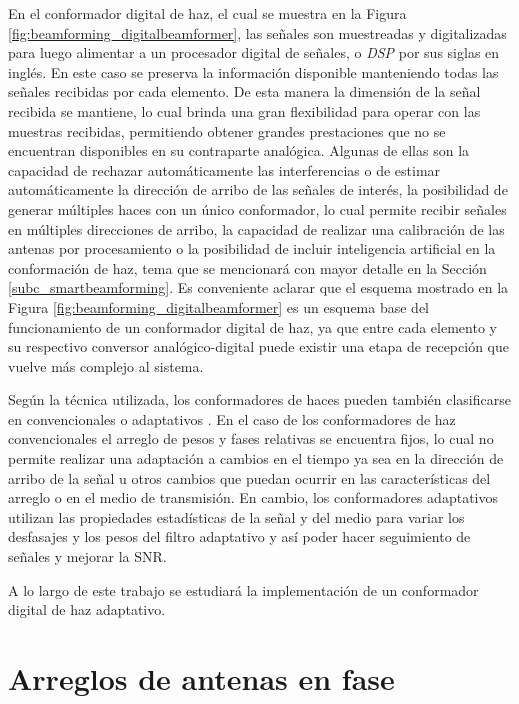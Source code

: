 En el conformador digital de haz, el cual se muestra en la Figura \ref{fig:beamforming_digitalbeamformer}, las señales son muestreadas y digitalizadas para luego alimentar a un procesador digital de señales, o \emph{DSP} por sus siglas en inglés. En este caso se preserva la información disponible manteniendo todas las señales recibidas por cada elemento. De esta manera la dimensión de la señal recibida se mantiene, lo cual brinda una gran flexibilidad para operar con las muestras recibidas, permitiendo obtener grandes prestaciones que no se encuentran disponibles en su contraparte analógica. Algunas de ellas son la capacidad de rechazar automáticamente las interferencias o de estimar automáticamente la dirección de arribo de las señales de interés, la posibilidad de generar múltiples haces con un único conformador, lo cual permite recibir señales en múltiples direcciones de arribo, la capacidad de realizar una calibración de las antenas por procesamiento o la posibilidad de incluir inteligencia artificial en la conformación de haz, tema que se mencionará con mayor detalle en la Sección \ref{subc_smartbeamforming}. Es conveniente aclarar que el esquema mostrado en la Figura \ref{fig:beamforming_digitalbeamformer} es un esquema base del funcionamiento de un conformador digital de haz, ya que entre cada elemento y su respectivo conversor analógico-digital puede existir una etapa de recepción que vuelve más complejo al sistema.

Según la técnica utilizada, los conformadores de haces pueden también clasificarse en convencionales o adaptativos \cite{bib:digitalantennas}. En el caso de los conformadores de haz convencionales el arreglo de pesos y fases relativas se encuentra fijos, lo cual no permite realizar una adaptación a cambios en el tiempo ya sea en la dirección de arribo de la señal u otros cambios que puedan ocurrir en las características del arreglo o en el medio de transmisión. En cambio, los conformadores adaptativos utilizan las propiedades estadísticas de la señal y del medio para variar los desfasajes y los pesos del filtro adaptativo y así poder hacer seguimiento de señales y mejorar la SNR.

A lo largo de este trabajo se estudiará la implementación de un conformador digital de haz adaptativo.


\section{Arreglos de antenas en fase}\label{subc:beamforming_phasedarrays}

